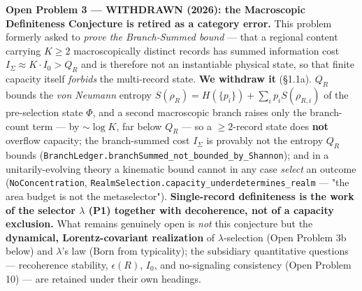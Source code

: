 \documentclass[11pt,a4paper]{article}
\begin{document}
\textbf{Open Problem 3 — WITHDRAWN (2026): the Macroscopic Definiteness Conjecture is retired as a category error.}
This problem formerly asked to \emph{prove the Branch-Summed bound} — that a regional content carrying $K \ge 2$ macroscopically distinct records has summed information cost $I_\Sigma \approx K\cdot I_0 > Q_R$ and is therefore not an instantiable physical state, so that finite capacity itself \emph{forbids} the multi-record state. \textbf{We withdraw it} (§1.1a). $Q_R$ bounds the \emph{von Neumann} entropy $S(\rho_R) = H(\{p_i\}) + \sum_i p_i S(\rho_{R,i})$ of the pre-selection state $\Phi$, and a second macroscopic branch raises only the branch-count term — by $\sim\!\log K$, far below $Q_R$ — so a $\ge 2$-record state does \textbf{not} overflow capacity; the branch-summed cost $I_\Sigma$ is provably not the entropy $Q_R$ bounds (\texttt{BranchLedger.branchSummed\_not\_bounded\_by\_Shannon}); and in a unitarily-evolving theory a kinematic bound cannot in any case \emph{select} an outcome (\texttt{NoConcentration}, \texttt{RealmSelection.capacity\_underdetermines\_realm} — "the area budget is not the metaselector"). \textbf{Single-record definiteness is the work of the selector $\lambda$ (P1) together with decoherence, not of a capacity exclusion.} What remains genuinely open is \emph{not} this conjecture but the \textbf{dynamical, Lorentz-covariant realization} of $\lambda$-selection (Open Problem 3b below) and $\lambda$'s law (Born from typicality); the subsidiary quantitative questions — recoherence stability, $\epsilon(R)$, $I_0$, and no-signaling consistency (Open Problem 10) — are retained under their own headings.
\end{document}
